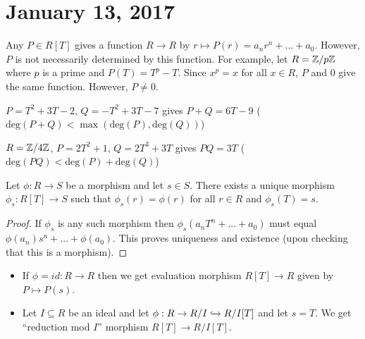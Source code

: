 \section{January 13, 2017} %

\begin{rmk}
Any $P \in R[T]$ gives a function $R \rightarrow R$ by $r \mapsto P(r) = a_nr^n + ... + a_0$.  However, $P$ is not necessarily determined by this function.  For example, let $R = \mathbb{Z} / p\mathbb{Z}$ where $p$ is a prime and $P(T) = T^p - T$.  Since $x^p = x$ for all $x \in R$, $P$ and $0$ give the same function.  However, $P \neq 0$.
\end{rmk}

\begin{ex}

\item $P = T^2 + 3T - 2$, $Q = -T^2 + 3T - 7$ gives $P+Q = 6T - 9$ ($\text{deg}(P+Q) < \max(\text{deg}(P),\text{deg}(Q))$)

\item $R = \mathbb{Z}/4\mathbb{Z}$, $P = 2T^2+1$, $Q = 2T^3+3T$ gives $PQ = 3T$ ($\text{deg}(PQ) < \text{deg}(P)+\text{deg}(Q)$)

\end{ex}

\begin{fact} \label{Fact 1, Jan 13}
Let $\phi : R \rightarrow S$ be a morphism and let $s \in S$.  There exists a unique morphism $\phi_s : R[T] \rightarrow S$ such that $\phi_s(r) = \phi(r)$ for all $r \in R$ and $\phi_s(T) = s$.
\end{fact}

\begin{proof}
If $\phi_s$ is any such morphism then $\phi_s(a_nT^n + ... + a_0)$ must equal $\phi(a_n)s^n + ... + \phi(a_0)$.  This proves uniqueness and existence (upon checking that this is a morphism).
\end{proof}

\begin{ex} \hspace{0.5cm}

\begin{itemize}

\item If $\phi = id : R \rightarrow R$ then we get evaluation morphism $R[T] \rightarrow R$ given by $P \mapsto P(s)$.

\item Let $I \subseteq R$ be an ideal and let $\phi : R \rightarrow R/I \xhookrightarrow{} R/I[T]$ and let $s = T$.  We get ``reduction mod $I$'' morphism $R[T]\rightarrow R/I[T]$.

\end{itemize}

\end{ex}

